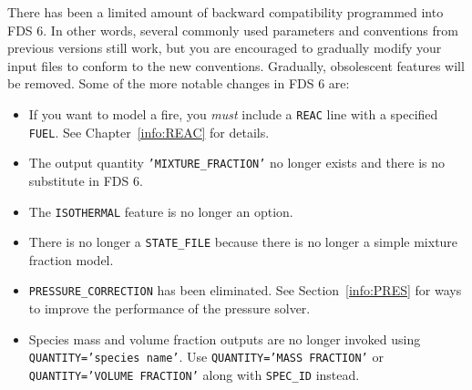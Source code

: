 \documentclass[11pt]{book}
\newcommand{\ct}{\tt\small}
\begin{document}
There has been a limited amount of backward compatibility programmed into FDS 6. In other words, several commonly used parameters and conventions from previous versions still
work, but you are encouraged to gradually modify your input files to conform to the new conventions. Gradually, obsolescent features will be removed. Some of the more notable changes
in FDS 6 are:
\begin{itemize}
\item If you want to model a fire, you {\em must} include a {\ct REAC} line with a specified {\ct FUEL}. See Chapter~\ref{info:REAC} for details.
\item The output quantity {\ct 'MIXTURE\_FRACTION'} no longer exists and there is no substitute in FDS 6.
\item The {\ct ISOTHERMAL} feature is no longer an option.
\item There is no longer a {\ct STATE\_FILE} because there is no longer a simple mixture fraction model.
\item {\ct PRESSURE\_CORRECTION} has been eliminated. See Section~\ref{info:PRES} for ways to improve the performance of the pressure solver.
\item Species mass and volume fraction outputs are no longer invoked using {\ct QUANTITY='species name'}. Use {\ct QUANTITY='MASS FRACTION'} or {\ct QUANTITY='VOLUME FRACTION'} along with
{\ct SPEC\_ID} instead.
\end{itemize}
\end{document}
